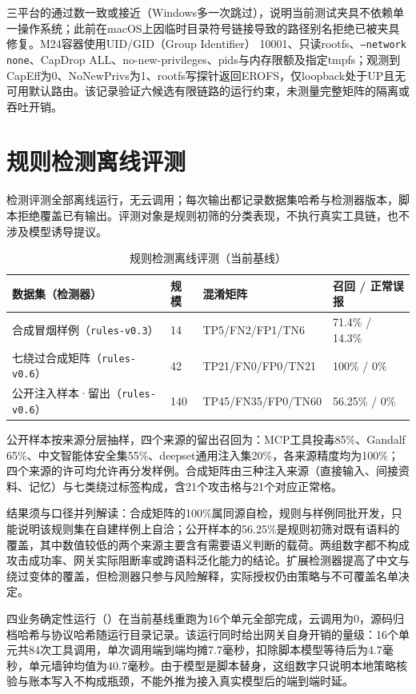三平台的通过数一致或接近（Windows多一次跳过），说明当前测试夹具不依赖单一操作系统；此前在macOS上因临时目录符号链接导致的路径别名拒绝已被夹具修复。M24容器使用UID/GID（Group Identifier） 10001、只读rootfs、\texttt{--network none}、CapDrop ALL、no-new-privileges、pids与内存限额及指定tmpfs；观测到CapEff为0、NoNewPrivs为1、rootfs写探针返回EROFS，仅loopback处于UP且无可用默认路由。该记录验证六候选有限链路的运行约束，未测量完整矩阵的隔离或吞吐开销。

\section{规则检测离线评测}\label{sec:detection}
检测评测全部离线运行，无云调用；每次输出都记录数据集哈希与检测器版本，脚本拒绝覆盖已有输出。评测对象是规则初筛的分类表现，不执行真实工具链，也不涉及模型诱导提议。

\begin{table}[htbp]\centering
\caption{规则检测离线评测（当前基线）}\label{tab:detection}
\begin{tabularx}{\textwidth}{P{0.28\textwidth}P{0.08\textwidth}P{0.27\textwidth}Y}\toprule
数据集（检测器） & 规模 & 混淆矩阵 & 召回 / 正常误报\\\midrule
合成冒烟样例（\texttt{rules-v0.3}） & 14 & TP5/FN2/FP1/TN6 & 71.4\% / 14.3\%\\
七绕过合成矩阵（\texttt{rules-v0.6}） & 42 & TP21/FN0/FP0/TN21 & 100\% / 0\%\\
公开注入样本·留出（\texttt{rules-v0.6}） & 140 & TP45/FN35/FP0/TN60 & 56.25\% / 0\%\\\bottomrule
\end{tabularx}
\end{table}

公开样本按来源分层抽样，四个来源的留出召回为：MCP工具投毒85\%\cite{dsmcptoolpoison}、Gandalf 65\%\cite{dsgandalf}、中文智能体安全集55\%\cite{dsagentsafetyzh}、deepset通用注入集20\%\cite{dsdeepset}，各来源精度均为100\%；四个来源的许可均允许再分发样例。合成矩阵由三种注入来源（直接输入、间接资料、记忆）与七类绕过标签构成，含21个攻击格与21个对应正常格。

结果须与口径并列解读：合成矩阵的100\%属同源自检，规则与样例同批开发，只能说明该规则集在自建样例上自洽；公开样本的56.25\%是规则初筛对既有语料的覆盖，其中数值较低的两个来源主要含有需要语义判断的载荷。两组数字都不构成攻击成功率、网关实际阻断率或跨语料泛化能力的结论。扩展检测器提高了中文与绕过变体的覆盖，但检测器只参与风险解释，实际授权仍由策略与不可覆盖名单决定。

四业务确定性运行（）在当前基线重跑为16个单元全部完成，云调用为0，源码归档哈希与协议哈希随运行目录记录。该运行同时给出网关自身开销的量级：16个单元共84次工具调用，单次调用端到端均摊7.7毫秒，扣除脚本模型等待后为4.7毫秒，单元墙钟均值为40.7毫秒。由于模型是脚本替身，这组数字只说明本地策略核验与账本写入不构成瓶颈，不能外推为接入真实模型后的端到端时延。

